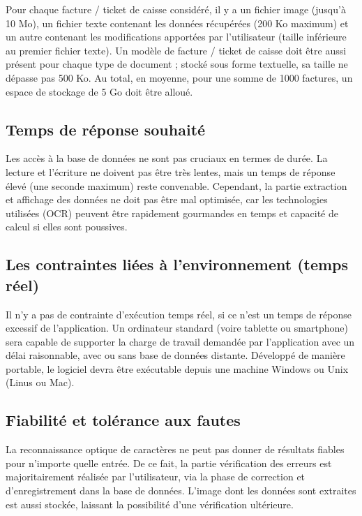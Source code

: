 Pour chaque facture / ticket de caisse considéré, il y a un fichier image (jusqu’à 10 Mo), un fichier texte contenant les données récupérées (200 Ko maximum) et un autre contenant les modifications apportées par l’utilisateur (taille inférieure au premier fichier texte). Un modèle de facture / ticket de caisse doit être aussi présent pour chaque type de document ; stocké sous forme textuelle, sa taille ne dépasse pas 500 Ko.
Au total, en moyenne, pour une somme de 1000 factures, un espace de stockage de 5 Go doit être alloué.

\subsection{Temps de réponse souhaité}

Les accès à la base de données ne sont pas cruciaux en termes de durée. La lecture et l’écriture ne doivent pas être très lentes, mais un temps de réponse élevé (une seconde 
maximum) reste convenable. Cependant, la partie extraction et affichage des données ne 
doit pas être mal optimisée, car les technologies utilisées (OCR) peuvent être rapidement gourmandes en temps et capacité de calcul si elles sont poussives.

\subsection{Les contraintes liées à l'environnement (temps réel)}

Il n’y a pas de contrainte d’exécution temps réel, si ce n’est un temps de réponse excessif de l’application. Un ordinateur standard (voire tablette ou smartphone) sera capable de supporter la charge de travail demandée par l’application avec un délai raisonnable, avec ou sans base de données distante.
Développé de manière portable, le logiciel devra être exécutable depuis une machine Windows ou Unix (Linus ou Mac).

\subsection{Fiabilité et tolérance aux fautes}

La reconnaissance optique de caractères ne peut pas donner de résultats fiables pour n’importe quelle entrée. De ce fait, la partie vérification des erreurs est majoritairement réalisée par l’utilisateur, via la phase de correction et d’enregistrement dans la base de données. L’image dont les données sont extraites est aussi stockée, laissant la possibilité d’une vérification ultérieure.

